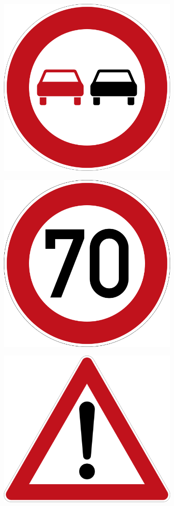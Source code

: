 \begin{figure}[!h]
\begin{subfigure}{.19\linewidth}
  \centering
  \includegraphics[width=0.7\linewidth]{imgs/4_real}
\end{subfigure}%
\begin{subfigure}{.19\linewidth}
  \centering
  \includegraphics[width=0.7\linewidth]{imgs/7_real}
\end{subfigure}
\begin{subfigure}{.19\linewidth}
  \centering
  \includegraphics[width=0.7\linewidth]{imgs/10_real}

\end{subfigure}
\end{figure}
